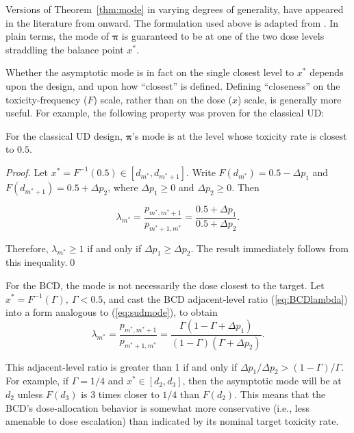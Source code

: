 Versions of Theorem~\ref{thm:mode} in varying degrees of generality, have appeared in the literature from \cite{Derm:Nonp:1957} onward. The formulation used above is adapted from \cite{Oron:Hoff:thek:2009}. In plain terms, the mode of $\boldsymbol{\pi}$ is guaranteed to be at one of the two dose levels straddling the balance point $x^*$.

Whether the asymptotic mode is in fact on the single closest level to $x^*$ depends upon the design, and upon how ``closest'' is defined. Defining ``closeness'' on the toxicity-frequency ($F$) scale, rather than on the dose ($x$) scale, is generally more useful. For example, the following property was proven for the classical UD:

\begin{thm}\label{thm:modesud}\citep{Oron:Hoff:thek:2009}
For the classical UD design, $\boldsymbol{\pi}$'s mode is at the level whose toxicity rate is closest to $0.5$.
\end{thm}

\begin{proof} Let $x^*=F^{-1}(0.5)\in [d_{m^*},d_{m^*+1}]$. Write $F\left(d_{m^*}\right)=0.5-\Delta p_1$ and $F\left(d_{m^*+1}\right)=0.5+\Delta p_2$, where $\Delta p_1\geq 0$ and $\Delta p_2\geq 0$. Then

\begin{equation}\label{eq:sudmode}
\lambda_{m^*}=\frac{p_{m^*,m^*+1}}{p_{m^*+1,m^*}}=\frac{0.5+\Delta p_1}{0.5+\Delta p_2}.
\end{equation}

\noindent Therefore, $\lambda_{m^*}\geq 1$ if and only if $\Delta p_1\geq\Delta p_2$. The result immediately follows from this inequality.\qed
\end{proof}

For the BCD, the mode is not necessarily the dose closest to the target. Let $x^*=F^{-1}(\Gamma),\ \Gamma<0.5$, and cast the BCD adjacent-level ratio (\ref{eq:BCDlambda}) into a form analogous to (\ref{eq:sudmode}), to obtain
\begin{equation*}
\lambda_{m^*}=\frac{p_{m^*,m^*+1}}{p_{m^*+1,m^*}}=\frac{\Gamma\left(1-\Gamma+\Delta p_1\right)}{(1-\Gamma)\left(\Gamma+\Delta p_2\right)}.
\end{equation*}

\noindent This adjacent-level ratio is greater than 1 if and only if $\Delta p_1/\Delta p_2>(1-\Gamma)/\Gamma$. For example, if $\Gamma=1/4$ and $x^*\in\left[d_2,d_3\right]$, then the asymptotic mode will be at $d_2$ unless $F\left(d_3\right)$ is 3 times closer to $1/4$ than $F\left(d_2\right)$. This means that the BCD's dose-allocation behavior is somewhat more conservative (i.e., less amenable to dose escalation) than indicated by its nominal target toxicity rate.

